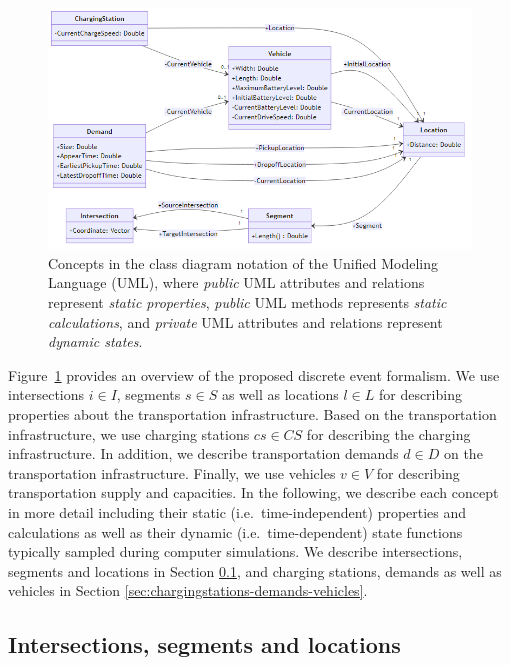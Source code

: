 \documentclass[graybox]{svmult}
\begin{document}
\begin{figure}[htbp]
	\centering
	\includegraphics[width=\textwidth]{../../diagrams/model/classes-v0.1.png}
	\caption{Concepts in the class diagram notation of the Unified Modeling Language (UML), where \textit{public} UML attributes and relations represent \textit{static properties}, \textit{public} UML methods represents \textit{static calculations}, and \textit{private} UML attributes and relations represent \textit{dynamic states}.}
	\label{fig:concepts}
\end{figure}

Figure~\ref{fig:concepts} provides an overview of the proposed discrete event formalism.
We use intersections $i \in I$, segments $s \in S$ as well as locations $l \in L$ for describing properties about the transportation infrastructure.
Based on the transportation infrastructure, we use charging stations $cs \in CS$ for describing the charging infrastructure.
In addition, we describe transportation demands $d \in D$ on the transportation infrastructure. 
Finally, we use vehicles $v \in V$ for describing transportation supply and capacities.
In the following, we describe each concept in more detail including their static (i.e.\ time-independent) properties and calculations as well as their dynamic (i.e.\ time-dependent) state functions typically sampled during computer simulations.
We describe intersections, segments and locations in Section \ref{sec:intersections-segments}, and charging stations, demands as well as vehicles in Section \ref{sec:chargingstations-demands-vehicles}.

\subsection{Intersections, segments and locations}
\label{sec:intersections-segments}
\end{document}
